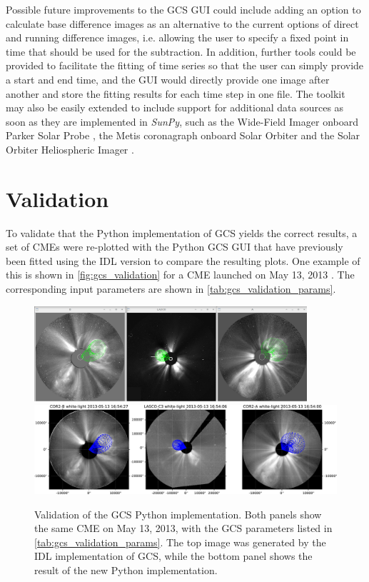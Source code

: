 Possible future improvements to the \ac{GCS} \ac{GUI} could include adding an option to calculate base difference images as an alternative to the current options of direct and running difference images, i.e. allowing the user to specify a fixed point in time that should be used for the subtraction. In addition, further tools could be provided to facilitate the fitting of time series so that the user can simply provide a start and end time, and the \ac{GUI} would directly provide one image after another and store the fitting results for each time step in one file. The toolkit may also be easily extended to include support for additional data sources as soon as they are implemented in \textit{SunPy}, such as the Wide-Field Imager onboard Parker Solar Probe \citep[WISPR,][]{Vourlidas-2016-WISPR}, the Metis coronagraph onboard Solar Orbiter \citep{Antonucci-2020-Metis} and the Solar Orbiter Heliospheric Imager \citep[SoloHI,][]{Howard-2020-SoloHI}.

\section{Validation}

To validate that the Python implementation of \ac{GCS} yields the correct results, a set of \acp{CME} were re-plotted  with the Python \ac{GCS} \ac{GUI} that have previously been fitted using the \ac{IDL} version to compare the resulting plots. One example of this is shown in \autoref{fig:gcs_validation} for a \ac{CME} launched on May 13, 2013 \citep[originally reconstructed by][Figure 2]{Gou-2020}. The corresponding input parameters are shown in \autoref{tab:gcs_validation_params}.

\begin{figure}
	\centering
	\includegraphics[width=0.9\textwidth]{images/gcs_validation_20130513_idl.png}\\[5mm]
	\includegraphics[width=\textwidth]{images/gcs_validation_20130513_python.pdf}
	\caption[Validation of the \acs{GCS} Python implementation]{Validation of the \ac{GCS} Python implementation. Both panels show the same \ac{CME} on May 13, 2013, with the \ac{GCS} parameters listed in \autoref{tab:gcs_validation_params}. The top image was generated by the \ac{IDL} implementation of \ac{GCS}, while the bottom panel shows the result of the new Python implementation.}
	\label{fig:gcs_validation}
\end{figure}

